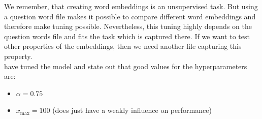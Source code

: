 We remember, that creating word embeddings is an unsupervised task. But using a
question word file makes it possible to compare different word embeddings and therefore make tuning possible. Nevertheless, this tuning highly depends on the 
question words file and fits the task which is captured there. If we want to 
test other properties of the embeddings, then we need another file capturing 
this property.\\

\cite{pennington2014glove} have tuned the model and state out that good values for 
the hyperparameters are:
\begin{itemize}
  \item $\alpha = 0.75$
  \item $x_\mathrm{max} = 100$ (does just have a weakly influence on performance)
\end{itemize}

    


